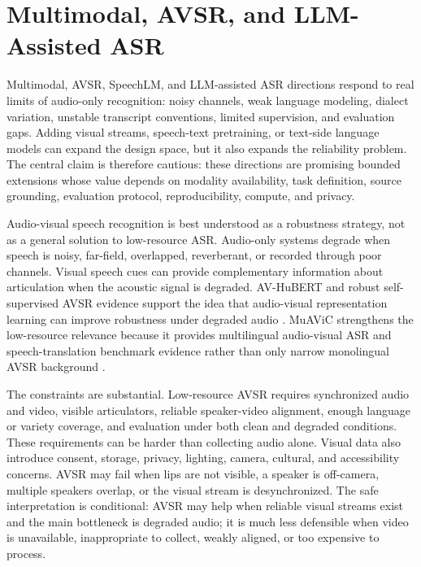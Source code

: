 \documentclass[pdflatex,sn-basic]{sn-jnl}
\theoremstyle{thmstyleone}
\theoremstyle{thmstyletwo}
\theoremstyle{thmstylethree}
\begin{document}
\section{Multimodal, AVSR, and LLM-Assisted ASR}

Multimodal, AVSR, SpeechLM, and LLM-assisted ASR directions respond to real limits of audio-only recognition: noisy channels, weak language modeling, dialect variation, unstable transcript conventions, limited supervision, and evaluation gaps. Adding visual streams, speech-text pretraining, or text-side language models can expand the design space, but it also expands the reliability problem. The central claim is therefore cautious: these directions are promising bounded extensions whose value depends on modality availability, task definition, source grounding, evaluation protocol, reproducibility, compute, and privacy.

Audio-visual speech recognition is best understood as a robustness strategy, not as a general solution to low-resource ASR. Audio-only systems degrade when speech is noisy, far-field, overlapped, reverberant, or recorded through poor channels. Visual speech cues can provide complementary information about articulation when the acoustic signal is degraded. AV-HuBERT and robust self-supervised AVSR evidence support the idea that audio-visual representation learning can improve robustness under degraded audio \citep{shi2022avhubert,shi2022robustavsr}. MuAViC strengthens the low-resource relevance because it provides multilingual audio-visual ASR and speech-translation benchmark evidence rather than only narrow monolingual AVSR background \citep{anwar23_interspeech}.

The constraints are substantial. Low-resource AVSR requires synchronized audio and video, visible articulators, reliable speaker-video alignment, enough language or variety coverage, and evaluation under both clean and degraded conditions. These requirements can be harder than collecting audio alone. Visual data also introduce consent, storage, privacy, lighting, camera, cultural, and accessibility concerns. AVSR may fail when lips are not visible, a speaker is off-camera, multiple speakers overlap, or the visual stream is desynchronized. The safe interpretation is conditional: AVSR may help when reliable visual streams exist and the main bottleneck is degraded audio; it is much less defensible when video is unavailable, inappropriate to collect, weakly aligned, or too expensive to process.
\end{document}
